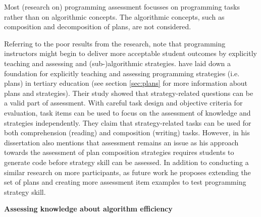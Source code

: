 Most (research on) programming assessment focusses on programming tasks rather than on algorithmic concepts. The algorithmic concepts, such as composition and decomposition of plans, are not considered.



 Referring to the poor results from the  research,  note that programming instructors might begin to deliver more acceptable student outcomes by explicitly teaching and assessing and (sub-)algorithmic strategies.  have laid down a foundation for explicitly teaching and assessing programming strategies (i.e. plans) in tertiary education (see section \ref{sec:plans} for more information about plans and strategies). Their study showed that strategy-related questions can be a valid part of assessment. With careful task design and objective criteria for evaluation, task items can be used to focus on the assessment of knowledge and strategies independently. They claim that strategy-related tasks can be used for both comprehension (reading) and composition (writing) tasks. However, in his dissertation \citeauthor{deRaadt2008} also mentions that assessment remains an issue as his approach towards the assessment of plan composition strategies requires students to generate code before strategy skill can be assessed. In addition to conducting a similar research on more participants, as future work he proposes extending the set of plans and creating more assessment item examples to test programming strategy skill.




\noindent \textbf{Assessing knowledge about algorithm efficiency}\newline


